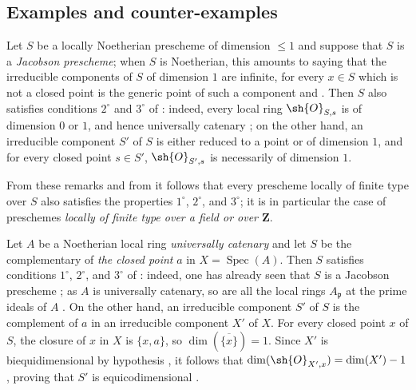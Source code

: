 \subsection{Examples and counter-examples}
\label{subsection:IV.10.7}

\begin{env}[10.7.1]
\label{IV.10.7.1}
Let $S$ be a locally Noetherian prescheme of dimension $\leq 1$ and suppose that $S$ is a \emph{Jacobson prescheme}; when $S$ is Noetherian, this amounts to saying that the irreducible components of $S$ of dimension $1$ are infinite, for every $x\in S$ which is not a closed point is the generic point of such a component  and .
Then $S$ also satisfies conditions $2^\circ$ and $3^\circ$ of : indeed, every local ring $\sh{O}_{S,s}$ is of dimension $0$ or $1$, and hence universally catenary ; on the other hand, an irreducible component $S'$ of $S$ is either reduced to a point or of dimension $1$, and for every closed point $s\in S'$, $\sh{O}_{S',s}$ is necessarily of dimension $1$.
\end{env}


From these remarks and from  it follows that every prescheme locally of finite type over $S$ also satisfies the properties $1^\circ$, $2^\circ$, and $3^\circ$; it is in particular the case of preschemes \emph{locally of finite type over a field or over $\mathbf{Z}$}.

\begin{env}[10.7.2]
\label{IV.10.7.2}
Let $A$ be a Noetherian local ring \emph{universally catenary} and let $S$ be the complementary of \emph{the closed point} $a$ in $X=\operatorname{Spec}(A)$.
Then $S$ satisfies conditions $1^\circ$, $2^\circ$, and $3^\circ$ of : indeed, one has already seen that $S$ is a Jacobson prescheme ; as $A$ is universally catenary, so are all the local rings $A_\mathfrak{p}$ at the prime ideals of $A$ .
On the other hand, an irreducible component $S'$ of $S$ is the complement of $a$ in an irreducible component $X'$ of $X$. For every closed point $x$ of $S$, the closure of $x$ in $X$ is $\{x,a\}$, so $\dim(\overline{\{x\}})=1$. Since $X'$ is biequidimensional by hypothesis , it follows that $\dim(\sh{O}_{X',x})=\dim(X')-1$ , proving that $S'$ is equicodimensional .
\end{env}

